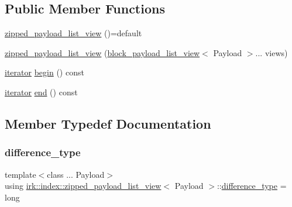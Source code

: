 \subsection*{Public Member Functions}
\begin{DoxyCompactItemize}
\item 
\mbox{\hyperlink{classirk_1_1index_1_1zipped__payload__list__view_ac1f66a414d5196e98ce325d1684bee36}{zipped\+\_\+payload\+\_\+list\+\_\+view}} ()=default
\item 
\mbox{\hyperlink{classirk_1_1index_1_1zipped__payload__list__view_a47c5a4bf0f8fd1baf10f50bba6325092}{zipped\+\_\+payload\+\_\+list\+\_\+view}} (\mbox{\hyperlink{classirk_1_1index_1_1block__payload__list__view}{block\+\_\+payload\+\_\+list\+\_\+view}}$<$ Payload $>$... views)
\item 
\mbox{\hyperlink{classirk_1_1index_1_1zipped__payload__list__view_1_1iterator}{iterator}} \mbox{\hyperlink{classirk_1_1index_1_1zipped__payload__list__view_aec7df8626683a4f71aa2b733d36d0a4c}{begin}} () const
\item 
\mbox{\hyperlink{classirk_1_1index_1_1zipped__payload__list__view_1_1iterator}{iterator}} \mbox{\hyperlink{classirk_1_1index_1_1zipped__payload__list__view_af10848c654db6e4d0b342fe764c0f77b}{end}} () const
\end{DoxyCompactItemize}


\subsection{Member Typedef Documentation}
\mbox{\label{classirk_1_1index_1_1zipped__payload__list__view_ac64dd5a88b49bb118bb780083f62907d}} 
\subsubsection{\texorpdfstring{difference\+\_\+type}{difference\_type}}
{\footnotesize\ttfamily template$<$class ... Payload$>$ \\
using \mbox{\hyperlink{classirk_1_1index_1_1zipped__payload__list__view}{irk\+::index\+::zipped\+\_\+payload\+\_\+list\+\_\+view}}$<$ Payload $>$\+::\mbox{\hyperlink{classirk_1_1index_1_1zipped__payload__list__view_ac64dd5a88b49bb118bb780083f62907d}{difference\+\_\+type}} =  long}

